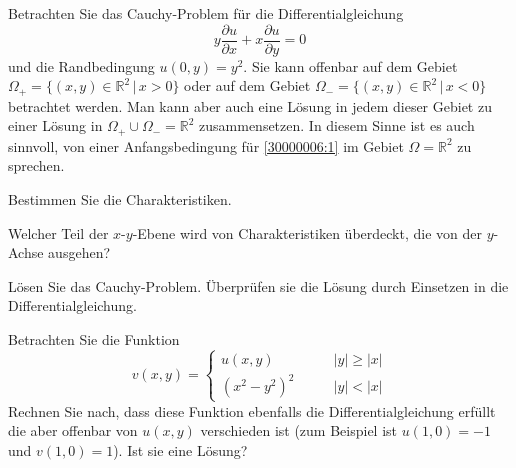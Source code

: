 Betrachten Sie das Cauchy-Problem für die Differentialgleichung
\begin{equation}
y\frac{\partial u}{\partial x}+x\frac{\partial u}{\partial y}=0
\label{30000006:1}
\end{equation}
und die Randbedingung $u(0,y)=y^2$.
Sie kann offenbar auf dem Gebiet $\Omega_+=\{ (x,y)\in\mathbb R^2\,|\, x > 0\}$
oder auf dem Gebiet $\Omega_-=\{(x,y)\in\mathbb R^2\,|\, x <0\}$ betrachtet
werden. Man kann aber auch eine Lösung in jedem dieser Gebiet zu einer
Lösung in $\Omega_+\cup\Omega_-=\mathbb R^2$ zusammensetzen. In diesem
Sinne ist es auch sinnvoll, von einer Anfangsbedingung für
\eqref{30000006:1} im Gebiet $\Omega=\mathbb R^2$ zu sprechen.
\begin{teilaufgaben}
\item Bestimmen Sie die Charakteristiken.
\item Welcher Teil der $x$-$y$-Ebene wird von Charakteristiken überdeckt,
die von der $y$-Achse ausgehen?
\item Lösen Sie das Cauchy-Problem. Überprüfen sie die Lösung durch
Einsetzen in die Differentialgleichung.
\item Betrachten Sie die Funktion
\[
v(x,y)=\begin{cases}
u(x,y)&\qquad |y|\ge |x|\\
(x^2-y^2)^2&\qquad |y|<|x|
\end{cases}
\]
Rechnen Sie nach, dass diese Funktion ebenfalls die Differentialgleichung
erfüllt
die aber offenbar von $u(x,y)$ verschieden ist (zum Beispiel ist
$u(1,0)=-1$ und $v(1,0)=1$). Ist sie eine Lösung?
\end{teilaufgaben}

